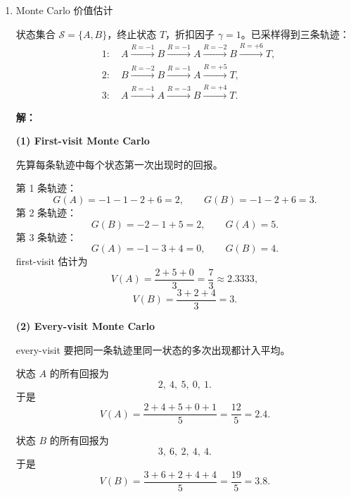 \documentclass[a4paper]{article}
\newenvironment{solution}{\par\noindent\textbf{解：}\par}{\par}
\begin{document}
\begin{enumerate}
\item Monte Carlo 价值估计

状态集合 \(\mathcal S=\{A,B\}\)，终止状态 \(T\)，折扣因子
\(\gamma=1\)。已采样得到三条轨迹：
\[
\begin{aligned}
&1:\quad A \xrightarrow{R=-1} B \xrightarrow{R=-1} A
\xrightarrow{R=-2} B \xrightarrow{R=+6} T,\\
&2:\quad B \xrightarrow{R=-2} B \xrightarrow{R=-1} A
\xrightarrow{R=+5} T,\\
&3:\quad A \xrightarrow{R=-1} A \xrightarrow{R=-3} B
\xrightarrow{R=+4} T.
\end{aligned}
\]

\begin{solution}
\textbf{(1) First-visit Monte Carlo}

先算每条轨迹中每个状态第一次出现时的回报。

第 1 条轨迹：
\[
G(A)= -1-1-2+6=2,\qquad
G(B)= -1-2+6=3.
\]
第 2 条轨迹：
\[
G(B)= -2-1+5=2,\qquad
G(A)=5.
\]
第 3 条轨迹：
\[
G(A)= -1-3+4=0,\qquad
G(B)=4.
\]
first-visit 估计为
\[
V(A)=\frac{2+5+0}{3}=\frac73\approx 2.3333,
\]
\[
V(B)=\frac{3+2+4}{3}=3.
\]

\textbf{(2) Every-visit Monte Carlo}

every-visit 要把同一条轨迹里同一状态的多次出现都计入平均。

状态 \(A\) 的所有回报为
\[
2,\ 4,\ 5,\ 0,\ 1.
\]
于是
\[
V(A)=\frac{2+4+5+0+1}{5}=\frac{12}{5}=2.4.
\]

状态 \(B\) 的所有回报为
\[
3,\ 6,\ 2,\ 4,\ 4.
\]
于是
\[
V(B)=\frac{3+6+2+4+4}{5}=\frac{19}{5}=3.8.
\]
\end{solution}

\end{enumerate}
\end{document}
